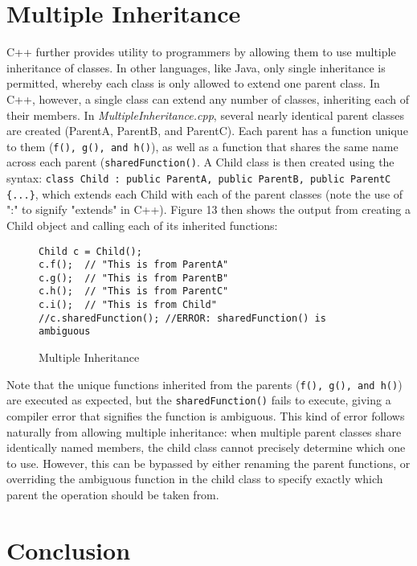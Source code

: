 \documentclass[11pt]{article}
\begin{document}
\section{Multiple Inheritance}
	
	C++ further provides utility to programmers by allowing them to use multiple inheritance of classes.  In other languages, like Java, only single inheritance is permitted, whereby each class is only allowed to extend one parent class.  In C++, however, a single class can extend any number of classes, inheriting each of their members.  In \textit{MultipleInheritance.cpp}, several nearly identical parent classes are created (ParentA, ParentB, and ParentC).  Each parent has a function unique to them (\texttt{f(), g(), and h()}), as well as a function that shares the same name across each parent (\texttt{sharedFunction()}.  A Child class is then created using the syntax: \texttt{class Child : public ParentA, public ParentB, public ParentC \{...\}}, which extends each Child with each of the parent classes (note the use of ":" to signify "extends" in C++).  Figure 13 then shows the output from creating a Child object and calling each of its inherited functions:

\begin{figure}[!h]
\centering
\begin{BVerbatim}
Child c = Child();
c.f();  // "This is from ParentA"
c.g();  // "This is from ParentB"
c.h();  // "This is from ParentC"
c.i();  // "This is from Child"
//c.sharedFunction(); //ERROR: sharedFunction() is ambiguous
\end{BVerbatim}
\caption{Multiple Inheritance}
\end{figure} \FloatBarrier

\noindent
Note that the unique functions inherited from the parents (\texttt{f(), g(), and h()}) are executed as expected, but the \texttt{sharedFunction()} fails to execute, giving a compiler error that signifies the function is ambiguous.  This kind of error follows naturally from allowing multiple inheritance: when multiple parent classes share identically named members, the child class cannot precisely determine which one to use.  However, this can be bypassed by either renaming the parent functions, or overriding the ambiguous function in the child class to specify exactly which parent the operation should be taken from.

\section{Conclusion}
\end{document}
